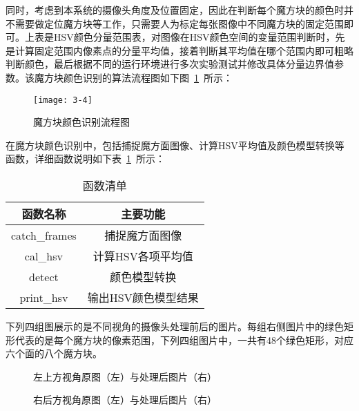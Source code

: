 同时，考虑到本系统的摄像头角度及位置固定，因此在判断每个魔方块的颜色时并不需要做定位魔方块等工作，只需要人为标定每张图像中不同魔方块的固定范围即可。上表是HSV颜色分量范围表，对图像在HSV颜色空间的变量范围判断时，先是计算固定范围内像素点的分量平均值，接着判断其平均值在哪个范围内即可粗略判断颜色，最后根据不同的运行环境进行多次实验测试并修改具体分量边界值参数。该魔方块颜色识别的算法流程图如下图~\ref{fig:3-4}~所示：

\begin{figure}[H]
	\centering
	\texttt{[image: 3-4]}
	\caption{魔方块颜色识别流程图}\label{fig:3-4}
\end{figure}

在魔方块颜色识别中，包括捕捉魔方面图像、计算HSV平均值及颜色模型转换等函数，详细函数说明如下表~\ref{tab:3-4}~所示：

\begin{table}[H]
	\caption{函数清单}\label{tab:3-4}
	\vspace{0.5em}
	\begin{center}
		{\wuhao
			\begin{tabular}{cc}
				\toprule
				函数名称 & 主要功能	\\
				\midrule
				catch\_frames & 捕捉魔方面图像 \\
				cal\_hsv & 计算HSV各项平均值 \\
				detect & 颜色模型转换\\
				print\_hsv & 输出HSV颜色模型结果\\
				\bottomrule
		\end{tabular}}
	\end{center}
	\vspace{-1.5em}
\end{table}

下列四组图展示的是不同视角的摄像头处理前后的图片。每组右侧图片中的绿色矩形代表的是每个魔方块的像素范围，下列四组图片中，一共有48个绿色矩形，对应六个面的八个魔方块。

\begin{figure}[H]
	\centering
	\subfigure{
		\texttt{[image: 3-5]}}
	\subfigure{
		\texttt{[image: 3-5.1]}}
	\caption{左上方视角原图（左）与处理后图片（右）}\label{fig:3-5}
\end{figure}

\begin{figure}[H]
	\centering
	\subfigure{
		\texttt{[image: 3-6]}}
	\subfigure{
		\texttt{[image: 3-6.1]}}
	\caption{右后方视角原图（左）与处理后图片（右）}\label{fig:3-6}
\end{figure}

